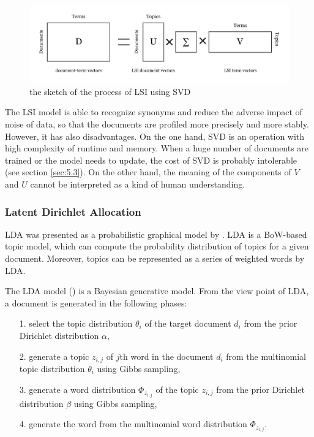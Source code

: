 \begin{figure}[!htb]
    \centering
    \includegraphics[width=1\textwidth]{fig/SVD.pdf}
    \caption{the sketch of the process of LSI using SVD}
    \label{fig:svd}
\end{figure}

The LSI model is able to recognize synonyms and reduce the adverse impact of noise of data, so that the documents are profiled more precisely and more stably.  However, it has also disadvantages. On the one hand, SVD is an operation with high complexity of runtime and memory. When a huge number of documents are trained or the model needs to update, the cost of SVD is probably intolerable (see section \ref{sec:5.3}). On the other hand, the meaning of the components of $V$ and $U$ cannot be interpreted as a kind of human understanding. 

\subsubsection{Latent Dirichlet Allocation}

LDA was presented as a probabilistic graphical model by \cite{Blei:2003}. LDA is a BoW-based topic model, which can compute the probability distribution of topics for a given document. Moreover, topics can be represented as a series of weighted words by LDA. 

The LDA model (\cite{Blei:2003}) is a Bayesian generative model. From the view point of LDA, a document is generated in the following phases:

\begin{itemize}
    \item[1.] select the topic distribution $\theta_i$ of the target document $d_i$ from the prior Dirichlet distribution $\alpha$, 
    \item[2.] generate a topic $z_{i,j}$ of $j$th word in the document $d_i$ from the multinomial topic distribution $\theta_i$ using Gibbs sampling,
    \item[3.] generate a word distribution $\Phi_{z_{i,j}}$ of the topic $z_{i,j}$ from the prior Dirichlet distribution $\beta$ using Gibbs sampling, 
    \item[4.] generate the word from the multinomial word distribution $\Phi_{z_{i,j}}$. 
\end{itemize}

